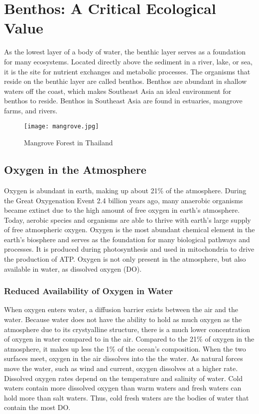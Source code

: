 \section{Benthos: A Critical Ecological Value}

As the lowest layer of a body of water, the benthic layer serves as a foundation for many ecosystems. Located directly above the sediment in a river, lake, or sea, it is the site for nutrient exchanges and metabolic processes. The organisms that reside on the benthic layer are called benthos. Benthos are abundant in shallow waters off the coast, which makes Southeast Asia an ideal environment for benthos to reside. Benthos in Southeast Asia are found in estuaries, mangrove farms, and rivers.

\begin{figure}[!ht]
        \centering
        \texttt{[image: mangrove.jpg]}
        \caption{Mangrove Forest in Thailand}
        \label{fig:Benthos Mangroves in Thailand}
\end{figure}

\subsection{Oxygen in the Atmosphere}
Oxygen is abundant in earth, making up about 21\% of the atmosphere. During the Great Oxygenation Event 2.4 billion years ago, many anaerobic organisms became extinct due to the high amount of free oxygen in earth's atmosphere. Today, aerobic species and organisms are able to thrive with earth's large supply of free atmospheric oxygen. Oxygen is the most abundant chemical element in the earth's biosphere and serves as the foundation for many biological pathways and processes. It is produced during photosynthesis and used in mitochondria to drive the production of ATP. Oxygen is not only present in the atmosphere, but also available in water, as dissolved oxygen (DO).

\subsubsection{Reduced Availability of Oxygen in Water}

When oxygen enters water, a diffusion barrier exists between the air and the water. Because water does not have the ability to hold as much oxygen as the atmosphere due to its crystyalline structure, there is a much lower concentration of oxygen in water compared to in the air. Compared to the 21\% of oxygen in the atmosphere, it makes up less the 1\% of the ocean's composition. When the two surfaces meet, oxygen in the air dissolves into the the water. As natural forces move the water, such as wind and current, oxygen dissolves at a higher rate. Dissolved oxygen rates depend on the temperature and salinity of water. Cold waters contain more dissolved oxygen than warm waters and fresh waters can hold more than salt waters. Thus, cold fresh waters are the bodies of water that contain the most DO. 

